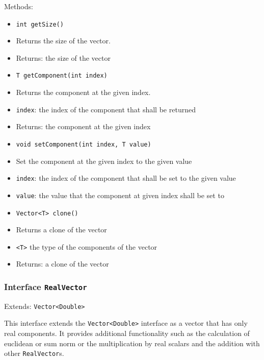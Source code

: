 \documentclass[parskip=full,11pt]{scrartcl}
\begin{document}
Methods:
\begin{itemize}\itemsep -10pt
\item \texttt{int getSize()}
\item[] Returns the size of the vector.
\item[] Returns: the size of the vector

\item \texttt{T getComponent(int index)}
\item[] Returns the component at the given index.
\item[] \texttt{index}: the index of the component that shall be returned
\item[] Returns: the component at the given index

\item \texttt{void setComponent(int index, T value)}
\item[] Set the component at the given index to the given value
\item[] \texttt{index}: the index of the component that shall be set to the given value
\item[] \texttt{value}: the value that the component at given index shall be set to

\item \texttt{Vector<T> clone()}
\item[] Returns a clone of the vector
\item[] \texttt{<T>} the type of the components of the vector
\item[] Returns: a clone of the vector
\end{itemize}

\subsubsection{Interface \texttt{RealVector}}
Extends: \texttt{Vector<Double>}

This interface extends the \texttt{Vector<Double>} interface as a vector that has only real components. It provides additional functionality such as the calculation of euclidean or sum norm or the multiplication by real scalars and the addition with other \texttt{RealVector}s.
\end{document}

